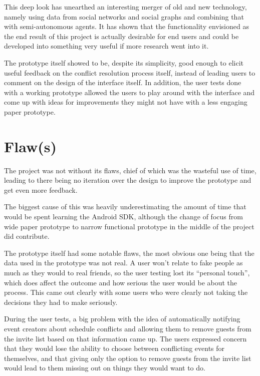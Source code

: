 \documentclass[a4paper,11pt]{report}
\begin{document}
This deep look has unearthed an interesting merger of old and new technology,
namely using data from social networks and social graphs and combining that with
semi-autonomous agents. It has shown that the functionality envisioned as the
end result of this project is actually desirable for end users and could be
developed into something very useful if more research went into it.

The prototype itself showed to be, despite its simplicity, good enough to elicit
useful feedback on the conflict resolution process itself, instead of leading
users to comment on the design of the interface itself. In addition, the user
tests done with a working prototype allowed the users to play around with the
interface and come up with ideas for improvements they might not have with a
less engaging paper prototype.

\section{Flaw(s)}

The project was not without its flaws, chief of which was the wasteful use of
time, leading to there being no iteration over the design to improve the
prototype and get even more feedback.

The biggest cause of this was heavily underestimating the amount of time that
would be spent learning the Android SDK, although the change of focus from wide
paper prototype to narrow functional prototype in the middle of the project did
contribute.

The prototype itself had some notable flaws, the most obvious one being that the
data used in the prototype was not real. A user won't relate to fake people as
much as they would to real friends, so the user testing lost its ``personal
touch'', which does affect the outcome and how serious the user would be about
the process. This came out clearly with some users who were clearly not taking
the decisions they had to make seriously.

During the user tests, a big problem with the idea of automatically notifying
event creators about schedule conflicts and allowing them to remove guests from
the invite list based on that information came up. The users expressed concern
that they would lose the ability to choose between conflicting events for
themselves, and that giving only the option to remove guests from the invite
list would lead to them missing out on things they would want to do.
\end{document}
